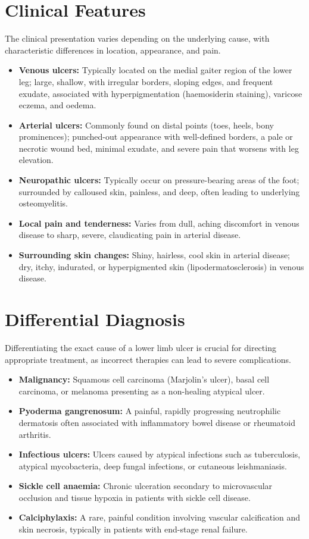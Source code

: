 \section*{Clinical Features}
The clinical presentation varies depending on the underlying cause, with characteristic differences in location, appearance, and pain.
\begin{itemize}
    \item \textbf{Venous ulcers:} Typically located on the medial gaiter region of the lower leg; large, shallow, with irregular borders, sloping edges, and frequent exudate, associated with hyperpigmentation (haemosiderin staining), varicose eczema, and oedema.
    \item \textbf{Arterial ulcers:} Commonly found on distal points (toes, heels, bony prominences); punched-out appearance with well-defined borders, a pale or necrotic wound bed, minimal exudate, and severe pain that worsens with leg elevation.
    \item \textbf{Neuropathic ulcers:} Typically occur on pressure-bearing areas of the foot; surrounded by calloused skin, painless, and deep, often leading to underlying osteomyelitis.
    \item \textbf{Local pain and tenderness:} Varies from dull, aching discomfort in venous disease to sharp, severe, claudicating pain in arterial disease.
    \item \textbf{Surrounding skin changes:} Shiny, hairless, cool skin in arterial disease; dry, itchy, indurated, or hyperpigmented skin (lipodermatosclerosis) in venous disease.
\end{itemize}

\section*{Differential Diagnosis}
Differentiating the exact cause of a lower limb ulcer is crucial for directing appropriate treatment, as incorrect therapies can lead to severe complications.
\begin{itemize}
    \item \textbf{Malignancy:} Squamous cell carcinoma (Marjolin's ulcer), basal cell carcinoma, or melanoma presenting as a non-healing atypical ulcer.
    \item \textbf{Pyoderma gangrenosum:} A painful, rapidly progressing neutrophilic dermatosis often associated with inflammatory bowel disease or rheumatoid arthritis.
    \item \textbf{Infectious ulcers:} Ulcers caused by atypical infections such as tuberculosis, atypical mycobacteria, deep fungal infections, or cutaneous leishmaniasis.
    \item \textbf{Sickle cell anaemia:} Chronic ulceration secondary to microvascular occlusion and tissue hypoxia in patients with sickle cell disease.
    \item \textbf{Calciphylaxis:} A rare, painful condition involving vascular calcification and skin necrosis, typically in patients with end-stage renal failure.
\end{itemize}


